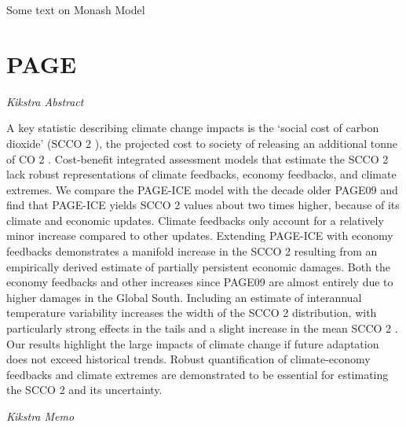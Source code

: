 \documentclass[
]{book}
\begin{document}
Some text on Monash Model

\hypertarget{page}{%
\section{PAGE}\label{page}}

\emph{Kikstra Abstract}

A key statistic describing climate change impacts is the `social cost of carbon dioxide' (SCCO 2 ), the
projected cost to society of releasing an additional tonne of CO 2 . Cost-benefit integrated
assessment models that estimate the SCCO 2 lack robust representations of climate feedbacks,
economy feedbacks, and climate extremes. We compare the PAGE-ICE model with the decade
older PAGE09 and find that PAGE-ICE yields SCCO 2 values about two times higher, because of its
climate and economic updates. Climate feedbacks only account for a relatively minor increase
compared to other updates. Extending PAGE-ICE with economy feedbacks demonstrates a
manifold increase in the SCCO 2 resulting from an empirically derived estimate of partially
persistent economic damages. Both the economy feedbacks and other increases since PAGE09 are
almost entirely due to higher damages in the Global South. Including an estimate of interannual
temperature variability increases the width of the SCCO 2 distribution, with particularly strong
effects in the tails and a slight increase in the mean SCCO 2 . Our results highlight the large impacts
of climate change if future adaptation does not exceed historical trends. Robust quantification of
climate-economy feedbacks and climate extremes are demonstrated to be essential for estimating
the SCCO 2 and its uncertainty.

\emph{Kikstra Memo}
\end{document}
